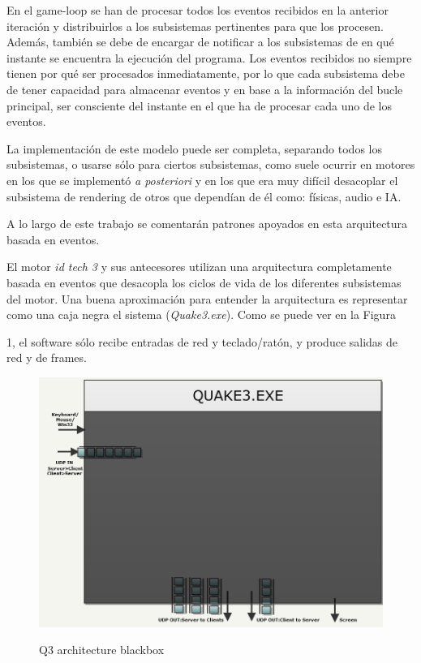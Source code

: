 \documentclass[a4paper,12pt]{report}
\begin{document}
\begin{itemize}
		En el game-loop se han de procesar todos los eventos recibidos en la anterior iteración y distribuirlos a los subsistemas pertinentes para que los procesen. Además, también se debe de encargar de notificar a los subsistemas de en qué instante se encuentra la ejecución del programa. Los eventos recibidos no siempre tienen por qué ser procesados inmediatamente, por lo que cada subsistema debe de tener capacidad para almacenar eventos y en base a la información del bucle principal, ser consciente del instante en el que ha de procesar cada uno de los eventos. 
		
		La implementación de este modelo puede ser completa, separando todos los subsistemas, o usarse sólo para ciertos subsistemas, como suele ocurrir en motores en los que se implementó \textit{a posteriori} y en los que era muy difícil desacoplar el subsistema de rendering de otros que dependían de él como: físicas, audio e IA.
	
	    A lo largo de este trabajo se comentarán patrones apoyados en esta arquitectura basada en eventos.
		
	\end{itemize}	

	
	El motor \textit{id tech 3} y sus antecesores utilizan una arquitectura completamente basada en eventos que desacopla los ciclos de vida de los diferentes subsistemas del motor. Una buena aproximación para entender la arquitectura es representar como una caja negra el sistema (\textit{Quake3.exe}). Como se puede ver en la Figura  
	1, el software sólo recibe entradas de red y teclado/ratón, y produce salidas de red y de frames.
	
	
	\begin{center}
		\begin{figure}[h]
			\includegraphics[width=1\textwidth]{images/q3_architecture_blackbox}
			\label{fig:architectureblackbox}
			\caption{Q3 architecture blackbox}
		\end{figure}
	\end{center}
\end{document}
